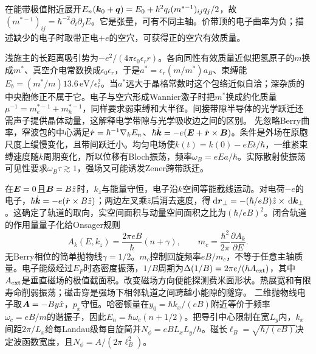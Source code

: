 \label{ch:transport}
在能带极值附近展开$E_n(\boldsymbol{k}_0+\boldsymbol{q})=E_0+\hbar^2q_i(m^{*-1})_{ij}q_j/2$，故$(m^{*-1})_{ij}=\hbar^{-2}\partial_i\partial_j E$。它是张量，可有不同主轴。价带顶的电子曲率为负；描述缺少的电子时取带正电$+e$的空穴，可获得正的空穴有效质量。

浅施主的长距离吸引势为$-e^2/(4\pi\epsilon_0\epsilon_r r)$。各向同性有效质量近似把氢原子的$m$换成$m^*$、真空介电常数换成$\epsilon_0\epsilon_r$，于是$a^*=\epsilon_r(m/m^*)a_B$、束缚能$E_b=(m^*/m)13.6\,\mathrm{eV}/\epsilon_r^2$。当$a^*$远大于晶格常数时这个包络近似自洽；深杂质的中央胞修正不属于它。电子与空穴形成Wannier激子时把$m^*$换成约化质量$\mu^{-1}=m_e^{*-1}+m_h^{*-1}$，同样要求弱束缚和大半径。间接带隙半导体的光学跃迁还需声子提供晶体动量，这解释电学带隙与光学吸收边之间的区别。
先忽略Berry曲率，窄波包的中心满足$\dot{\boldsymbol{r}}=\hbar^{-1}\nabla_kE_n$、$\hbar\dot{\boldsymbol{k}}=-e(\boldsymbol{E}+\dot{\boldsymbol{r}}\times\boldsymbol{B})$。条件是外场在原胞尺度上缓慢变化，且带间跃迁小。均匀电场使$k(t)=k(0)-eEt/\hbar$，一维紧束缚速度随$k$周期变化，所以位移有Bloch振荡，频率$\omega_B=eEa/\hbar$。实际散射使振荡可见性要求$\omega_B\tau\gtrsim1$，强场又可能诱发Zener跨带跃迁。

在$\boldsymbol{E}=0$且$\boldsymbol{B}=B\hat z$时，$k_z$与能量守恒，电子沿$k$空间等能截线运动。对电荷$-e$的电子，$\hbar\dot{\boldsymbol{k}}=-e(\dot{\boldsymbol{r}}\times B\hat z)$；两边左叉乘$\hat z$后消去速度，得$\,\mathrm d\boldsymbol{r}_\perp=-(\hbar/eB)\hat z\times\,\mathrm d\boldsymbol{k}_\perp$。这确定了轨道的取向，实空间面积与动量空间面积之比为$(\hbar/eB)^2$。闭合轨道的作用量量子化给Onsager规则
\begin{equation}
A_k(E,k_z)=\frac{2\pi eB}{\hbar}(n+\gamma),\qquad m_c=\frac{\hbar^2}{2\pi}\frac{\partial A_k}{\partial E}.
\end{equation}
无Berry相位的简单抛物线$\gamma=1/2$。$m_c$控制回旋频率$eB/m_c$，不等于任意主轴质量。电子能级经过$E_F$时态密度振荡，$1/B$周期为$\Delta(1/B)=2\pi e/(\hbar A_{\rm ext})$，其中$A_{\rm ext}$是垂直磁场的极值截面积。改变磁场方向便能探测费米面形状。热展宽和有限寿命削弱振荡；磁击穿是强场下相邻轨道之间跨越小能隙的隧穿。
二维抛物线电子取$\boldsymbol{A}=-By\hat x$，$p_x$守恒。哈密顿量在$y_0=\hbar k_x/(eB)$附近等价于频率$\omega_c=eB/m$的谐振子，因此$E_n=\hbar\omega_c(n+1/2)$。把导引中心限制在宽$L_y$内，$k_x$间距$2\pi/L_x$给每Landau级每自旋简并$N_\phi=eBL_xL_y/h$。磁长$\ell_B=\sqrt{\hbar/(eB)}$决定波函数宽度，且$N_\phi=A/(2\pi\ell_B^2)$。

